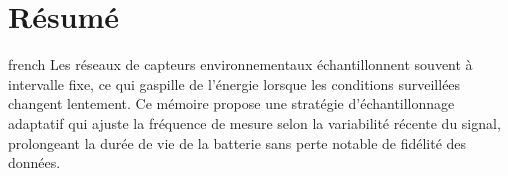 \chapter*{R\'esum\'e}
\label{chap-resume}

\begin{otherlanguage*}{french}
Les r\'eseaux de capteurs environnementaux \'echantillonnent souvent \`a
intervalle fixe, ce qui gaspille de l'\'energie lorsque les conditions
surveill\'ees changent lentement. Ce m\'emoire propose une strat\'egie
d'\'echantillonnage adaptatif qui ajuste la fr\'equence de mesure selon la
variabilit\'e r\'ecente du signal, prolongeant la dur\'ee de vie de la
batterie sans perte notable de fid\'elit\'e des donn\'ees.
\end{otherlanguage*}
